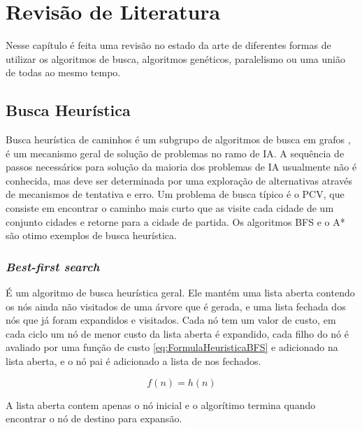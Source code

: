 \chapter[Revisão de Literatura]{Revisão de Literatura}


Nesse capítulo é feita uma revisão no estado da arte de diferentes formas de utilizar os algoritmos de busca, algoritmos genéticos, paralelismo ou uma união de todas ao mesmo tempo.

\section{Busca Heurística}

Busca heurística de caminhos é um subgrupo de algoritmos de busca em grafos \cite{Winston}, é um mecanismo geral de solução de problemas no ramo de IA. A sequência de passos necessários para solução da maioria dos problemas de IA usualmente não é conhecida, mas deve ser determinada por uma exploração de alternativas através de mecanismos de tentativa e erro. Um problema de busca típico é o PCV, que consiste em encontrar o caminho mais curto que as visite cada cidade de um conjunto cidades e retorne para a cidade de partida. Os algoritmos BFS e o A* são otimo exemplos de busca heurística. \cite{KORF199341}

\subsection{\textit{Best-first search}}

É um algoritmo de busca heurística geral. Ele mantém uma lista aberta contendo os nós ainda não visitados de uma árvore que é gerada, e uma lista fechada dos nós que já foram expandidos e visitados. Cada nó tem um valor de custo, em cada ciclo um nó de menor custo da lista aberta é expandido, cada filho do nó é avaliado por uma função de custo \ref{eq:FormulaHeuristicaBFS}  e adicionado na lista aberta, e o nó pai é adicionado a lista de nos fechados.

\begin{equation} \label{eq:FormulaHeuristicaBFS}
f(n) =  h(n)
\end{equation}

A lista aberta contem apenas o nó inicial e o algorítimo termina quando encontrar o nó de destino para expansão.\cite{KORF199341}

